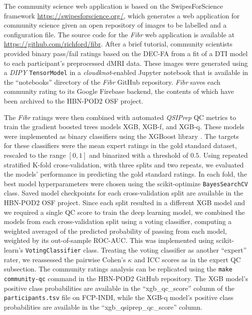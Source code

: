 \documentclass[9pt,lineno]{elife}
\begin{document}
The community science web application is based on the SwipesForScience framework
\url{https://swipesforscience.org/}, which generates a web application for
community science given an open repository of images to be labelled and a
configuration file. The source code for the \emph{Fibr} web application is
available at \url{https://github.com/richford/fibr}. After a brief tutorial,
community scientists provided binary pass/fail ratings based on the DEC-FA from
a fit of a DTI model to each participant's preprocessed dMRI data. These images were
generated using a \emph{DIPY} \citep{dipy} \texttt{TensorModel} in a
\emph{cloudknot}-enabled Jupyter notebook that is available in the ``notebooks''
directory of the \emph{Fibr} GitHub repository. \emph{Fibr} saves each community
rating to its Google Firebase backend, the contents of which have been archived
to the HBN-POD2 OSF project.

The \emph{Fibr} ratings were then combined with automated \emph{QSIPrep} QC
metrics to train the gradient boosted trees models XGB, XGB-f, and XGB-q. These
models were implemented as binary classifiers using the XGBoost library
\citep{xgboost}. The targets for these classifiers were the mean expert ratings
in the gold standard dataset, rescaled to the range $[0, 1]$ and binarized with
a threshold of $0.5$. Using repeated
stratified K-fold cross-validation, with three splits and two repeats, we
evaluated the models' performance in predicting the gold standard ratings. In
each fold, the best model hyperparameters were chosen using the scikit-optimize
\citep{scikit-optimize} \texttt{BayesSearchCV} class. Saved model checkpoints for
each cross-validation split are available in the HBN-POD2 OSF project. Since
each split resulted in a different XGB model and we required a single QC score
to train the deep learning model, we combined the models from each
cross-validation split using a voting classifier, computing a weighted averaged
of the predicted probability of passing from each model, weighted by its
out-of-sample ROC-AUC. This was implemented using scikit-learn's
\texttt{VotingClassifier} class. Treating the voting classifier as another
``expert'' rater, we reassessed the pairwise Cohen's $\kappa$ and ICC scores as
in the expert QC subsection. The community ratings analysis can be replicated
using the \texttt{make community-qc} command in the HBN-POD2 GitHub repository.
The XGB model's positive class probabilities are available in the
``xgb\_qc\_score'' column of the \texttt{participants.tsv} file on FCP-INDI, while
the XGB-q model's positive class probabilities are available in the
``xgb\_qsiprep\_qc\_score'' column.
\end{document}
